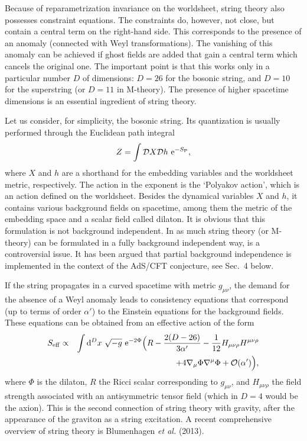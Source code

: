 \documentclass[12pt]{article}
\newcommand{\be}{\begin{equation}}
\newcommand{\ee}{\end{equation}}
\newcommand{\bea}{\begin{eqnarray}}
\newcommand{\eea}{\end{eqnarray}}
\newcommand{\lb}{\label}
\newcommand{\D}{{\rm d}}
\newcommand{\E}{{\rm e}}
\begin{document}
Because of reparametrization invariance on the worldsheet, string
theory also possesses constraint equations. The constraints do,
however, not close, but contain a central term on the right-hand
side. This corresponds to the presence of an anomaly (connected with
Weyl transformations). The vanishing of this anomaly can be achieved
if ghost fields are added that gain a central term which cancels the
original one. The important point is that this works only in a
particular number $D$ of dimensions: $D=26$ for the bosonic string,
and $D=10$ for the superstring (or $D=11$ in M-theory). The presence
of higher spacetime 
dimensions is an essential ingredient of string theory.   

Let us consider, for simplicity, the bosonic string. Its quantization
is usually performed through the Euclidean path integral
\be
\lb{9.2.2}
Z=\int{\mathcal D}X{\mathcal D}h\ \E^{-S_{\rm P}},
\ee
where $X$ and $h$ are a shorthand for the embedding variables and the
worldsheet metric, respectively. The action in the exponent is the
`Polyakov action', which is an action defined on the
worldsheet. Besides the dynamical variables $X$ and $h$, it contains
various background fields on spacetime, among them the metric of the
embedding space and a scalar field called dilaton. It is obvious that
this formulation is not background independent. In as much string
theory (or M-theory) can be formulated in a fully background
independent way, is a controversial issue. It has been argued that
partial background independence is implemented in the context of the
AdS/CFT conjecture, see Sec.~4 below.

If the string propagates in a curved spacetime with metric
$g_{\mu\nu}$, the demand for the absence of a Weyl anomaly leads to
consistency equations that correspond (up to terms of order $\alpha'$)
to the Einstein equations for the background fields. These equations
can be obtained from an effective action of the form
\bea
\lb{9.2.14}
S_{\rm eff} & \propto & 
\int\D^Dx\ \sqrt{-g}\ \E^{-2\Phi}\Big(R-\frac{2(D-26)}
{3\alpha'}-\frac{1}{12}H_{\mu\nu\rho}H^{\mu\nu\rho}
\nonumber\\
& & \; \;\;\;\; +4\nabla_{\mu}\Phi\nabla^{\mu}\Phi+{\mathcal O}(\alpha') 
\Big) ,
\eea
where $\Phi$ is the dilaton, $R$ the Ricci scalar corresponding to 
$g_{\mu\nu}$, and $H_{\mu\nu\rho}$ the field strength associated with
an antisymmetric tensor field (which in $D=4$ would be the axion). 
This is the second connection of string theory with gravity, after the
appearance of the graviton as a string excitation.
A recent comprehensive overview of string theory is Blumenhagen {\em
  et al.} (2013).
\end{document}
